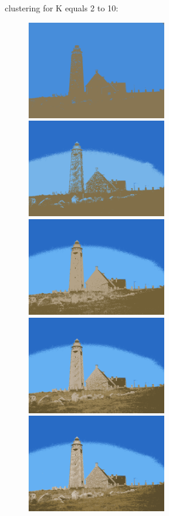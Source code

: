 clustering for K equals 2 to 10:\\
\begin{center}
\begin{figure}[H]
\centering\includegraphics[width=6cm]{./imgkmeanscluster01-02.png}
\centering\includegraphics[width=6cm]{./imgkmeanscluster01-03.png}\\
\centering\includegraphics[width=6cm]{./imgkmeanscluster01-04.png}
\centering\includegraphics[width=6cm]{./imgkmeanscluster01-05.png}\\
\centering\includegraphics[width=6cm]{./imgkmeanscluster01-06.png}

\end{figure}
\end{center}
